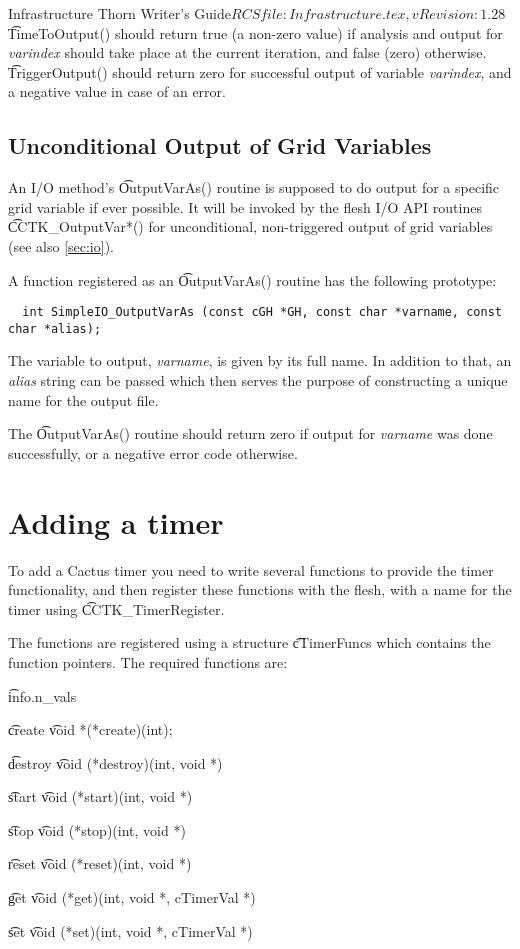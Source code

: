 \begin{cactuspart}{4}{Infrastructure Thorn Writer's Guide}{$RCSfile: Infrastructure.tex,v $}{$Revision: 1.28 $}
{\t TimeToOutput()} should return true (a non-zero value) if analysis and output
for {\it varindex} should take place at the current iteration, and false (zero)
otherwise.\\
{\t TriggerOutput()} should return zero for successful output of variable
{\it varindex}, and a negative value in case of an error.
%
%
\section{Unconditional Output of Grid Variables}

An I/O method's {\t OutputVarAs()} routine is supposed to do output for a
specific grid variable if ever possible. It will be invoked by the flesh I/O API
routines {\t CCTK\_OutputVar*()} for unconditional, non-triggered output of
grid variables (see also \ref{sec:io}).

A function registered as an {\t OutputVarAs()} routine has the following
prototype:
%
\begin{verbatim}
  int SimpleIO_OutputVarAs (const cGH *GH, const char *varname, const char *alias);
\end{verbatim}
%
The variable to output, {\it varname}, is given by its full name.
In addition to that, an {\it alias} string can be passed which then serves
the purpose of constructing a unique name for the output file.

The {\t OutputVarAs()} routine should return zero if output for {\it varname}
was done successfully, or a negative error code otherwise.


\chapter{Adding a timer}

To add a Cactus timer you need to write several functions to provide the 
timer functionality, and then register these functions with the flesh, with a name for the timer using {\t CCTK\_TimerRegister}.

The functions are registered using a structure {\t cTimerFuncs} which
contains the function pointers. The required functions are:

\begin{Lentry}

\item[{\t info.n\_vals}]
\item[{\t create}] {\t void *(*create)(int);}
\item[{\t destroy}] {\t void (*destroy)(int, void *)}
\item[{\t start}] {\t void (*start)(int, void *)}
\item[{\t stop}] {\t void (*stop)(int, void *)}
\item[{\t reset}] {\t void (*reset)(int, void *)}
\item[{\t get}] {\t void (*get)(int, void *, cTimerVal *)}
\item[{\t set}] {\t void (*set)(int, void *, cTimerVal *)}


\end{Lentry}
\end{cactuspart}

